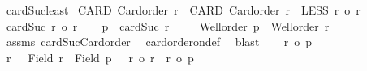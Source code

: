 \begin{isabellebody}
\isamarkupfalse%
\ cardSuc{\isacharunderscore}{\kern0pt}least{\isacharcolon}{\kern0pt}\isanewline
{}\ CARD{\isacharcolon}{\kern0pt}\ {\isachardoublequoteopen}Card{\isacharunderscore}{\kern0pt}order\ r{\isachardoublequoteclose}\ \ CARD{\isacharprime}{\kern0pt}{\isacharcolon}{\kern0pt}\ {\isachardoublequoteopen}Card{\isacharunderscore}{\kern0pt}order\ r{\isacharprime}{\kern0pt}{\isachardoublequoteclose}\ \ LESS{\isacharcolon}{\kern0pt}\ {\isachardoublequoteopen}r\ {\isacharless}{\kern0pt}o\ r{\isacharprime}{\kern0pt}{\isachardoublequoteclose}\isanewline
{}\ {\isachardoublequoteopen}cardSuc\ r\ {\isasymle}o\ r{\isacharprime}{\kern0pt}{\isachardoublequoteclose}\isanewline
%
\isadelimproof
%
\endisadelimproof
%
\isatagproof
{}\isamarkupfalse%
{\isacharminus}{\kern0pt}\isanewline
\ \ \isamarkupfalse%
\ {\isacharquery}{\kern0pt}p\ {\isacharequal}{\kern0pt}\ {\isachardoublequoteopen}cardSuc\ r{\isachardoublequoteclose}\isanewline
\ \ \isamarkupfalse%
\ {}{\isacharcolon}{\kern0pt}\ {\isachardoublequoteopen}Well{\isacharunderscore}{\kern0pt}order\ {\isacharquery}{\kern0pt}p\ {\isasymand}\ Well{\isacharunderscore}{\kern0pt}order\ r{\isacharprime}{\kern0pt}{\isachardoublequoteclose}\isanewline
\ \ \isamarkupfalse%
\ assms\ cardSuc{\isacharunderscore}{\kern0pt}Card{\isacharunderscore}{\kern0pt}order\ \isamarkupfalse%
\ card{\isacharunderscore}{\kern0pt}order{\isacharunderscore}{\kern0pt}on{\isacharunderscore}{\kern0pt}def\ \isamarkupfalse%
\ blast\isanewline
\ \ \isacommand{{\isacharbraceleft}{\kern0pt}}\isamarkupfalse%
\isamarkupfalse%
\ {\isachardoublequoteopen}r{\isacharprime}{\kern0pt}\ {\isacharless}{\kern0pt}o\ {\isacharquery}{\kern0pt}p{\isachardoublequoteclose}\isanewline
\ \ \ \isamarkupfalse%
\ \isamarkupfalse%
\ r{\isacharprime}{\kern0pt}{\isacharprime}{\kern0pt}\ \ {}{\isacharcolon}{\kern0pt}\ {\isachardoublequoteopen}Field\ r{\isacharprime}{\kern0pt}{\isacharprime}{\kern0pt}\ {\isacharless}{\kern0pt}\ Field\ {\isacharquery}{\kern0pt}p{\isachardoublequoteclose}\ \ {}{\isacharcolon}{\kern0pt}\ {\isachardoublequoteopen}r{\isacharprime}{\kern0pt}\ {\isacharequal}{\kern0pt}o\ r{\isacharprime}{\kern0pt}{\isacharprime}{\kern0pt}\ {\isasymand}\ r{\isacharprime}{\kern0pt}{\isacharprime}{\kern0pt}\ {\isacharless}{\kern0pt}o\ {\isacharquery}{\kern0pt}p{\isachardoublequoteclose}\isanewline

\end{isabellebody}

